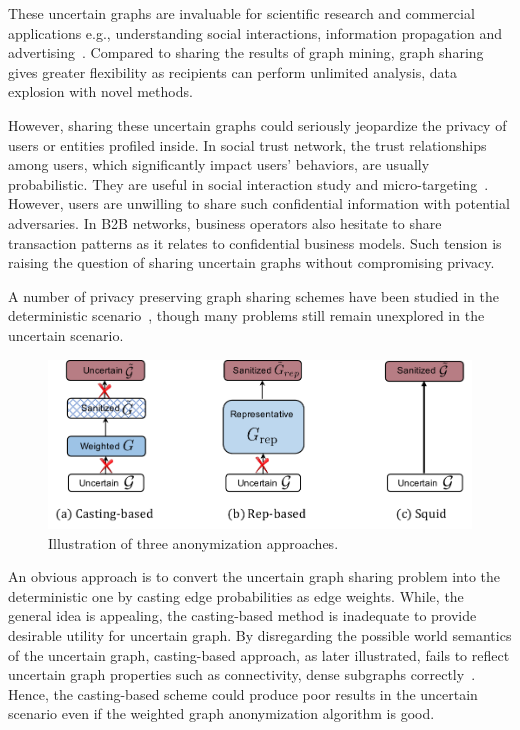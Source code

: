 These uncertain graphs are invaluable for scientific research and commercial applications e.g., understanding social interactions, information propagation and advertising~\cite{Kempe_Maximizing_2003,Cho_Friendship_2011}. 
Compared to sharing the results of graph mining, graph sharing gives greater flexibility as recipients can perform unlimited analysis, data explosion with novel methods.

However, sharing these uncertain graphs could seriously jeopardize the privacy of users or entities profiled inside.
In social trust network, the trust relationships among users, which significantly impact users' behaviors, are usually probabilistic.  They are useful in social interaction study and micro-targeting~\cite{Kempe_Maximizing_2003}. However, users are unwilling to share such confidential information with potential adversaries. In B2B networks, business operators also hesitate to share transaction patterns as it relates to confidential business models. Such tension is raising the question of sharing uncertain graphs without compromising privacy. 

A number of privacy preserving graph sharing schemes have been studied in the deterministic scenario~\cite{Liu_Towards_2008,Ying_Randomizing_2008,Wang2011,Liu_Privacy_2009,Nguyen_Anonymizing_2015,Sala_Sharing_2011,Xiao_Differentially_2014,lee2011}, though many problems still remain unexplored in the uncertain scenario.
\begin{figure}[!htb]
  \centering
  \includegraphics[width=0.9\linewidth]{ill/methods.pdf}
  \caption{Illustration of three anonymization approaches.}
\end{figure}

An obvious approach is to convert the uncertain graph sharing problem into the deterministic one by casting edge probabilities as edge weights. 
While, the general idea is appealing, the casting-based method is inadequate to provide desirable utility for uncertain graph. 
By disregarding the possible world semantics of the uncertain graph, casting-based approach, as later illustrated, fails to reflect uncertain graph properties such as connectivity, dense subgraphs correctly~\cite{Zhao_Detecting_2014,Hua_Probabilistic_2010}. 
Hence, the casting-based scheme could produce poor results in the uncertain scenario even if the weighted graph anonymization algorithm is good. 

